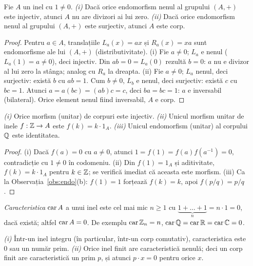 \begin{propozitie}\label{prop:endoaditiv}
Fie $A$ un inel cu $1\neq0$.
\emph{(i)} Dacă orice endomorfism nenul al grupului $(A,+)$ este injectiv, atunci $A$ nu are divizori ai lui zero.
\emph{(ii)} Dacă orice endomorfism nenul al grupului $(A,+)$ este surjectiv, atunci $A$ este corp.
\end{propozitie}
\begin{proof}
Pentru $a\in A$, translațiile $L_a(x)=ax$ și $R_a(x)=xa$ sunt endomorfisme ale lui $(A,+)$ (distributivitate).
(i) Fie $a\neq0$; $L_a$ e nenul ($L_a(1)=a\neq0$), deci injectiv. Din $ab=0=L_a(0)$ rezultă $b=0$: $a$ nu e divizor al lui zero la stânga; analog cu $R_a$ la dreapta.
(ii) Fie $a\neq0$; $L_a$ nenul, deci surjectiv: există $b$ cu $ab=1$. Cum $b\neq0$, $L_b$ e nenul, deci surjectiv: există $c$ cu $bc=1$. Atunci $a=a(bc)=(ab)c=c$, deci $ba=bc=1$: $a$ e inversabil (bilateral). Orice element nenul fiind inversabil, $A$ e corp.
\end{proof}

\begin{propozitie}\label{prop:morfcorp}
\emph{(i)} Orice morfism (unitar) de corpuri este injectiv. \emph{(ii)} Unicul morfism unitar de inele $f:\mathbb{Z}\to A$ este $f(k)=k\cdot1_A$. \emph{(iii)} Unicul endomorfism (unitar) al corpului $\mathbb{Q}$ este identitatea.
\end{propozitie}

\begin{proof}
(i) Dacă $f(a)=0$ cu $a\neq0$, atunci $1=f(1)=f(a)f(a^{-1})=0$, contradicție cu $1\neq0$ în codomeniu. (ii) Din $f(1)=1_A$ și aditivitate, $f(k)=k\cdot1_A$ pentru $k\in\mathbb{Z}$; se verifică imediat că aceasta este morfism. (iii) Ca la Observația~\ref{obs:endo}(b): $f(1)=1$ forțează $f(k)=k$, apoi $f(p/q)=p/q$.
\end{proof}

\begin{definitie}
\emph{Caracteristica} $\operatorname{car} A$ a unui inel este cel mai mic $n\ge1$ cu $\underbrace{1+\dots+1}_{n}=n\cdot1=0$, dacă există; altfel $\operatorname{car} A=0$. De exemplu $\operatorname{car}\mathbb{Z}_n=n$, $\operatorname{car}\mathbb{Q}=\operatorname{car}\mathbb{R}=\operatorname{car}\mathbb{C}=0$.
\end{definitie}

\begin{propozitie}\label{prop:caract}
\emph{(i)} Într-un inel integru (în particular, într-un corp comutativ), caracteristica este $0$ sau un număr prim. \emph{(ii)} Orice inel finit are caracteristică nenulă; deci un corp finit are caracteristică un prim $p$, și atunci $p\cdot x=0$ pentru orice $x$.
\end{propozitie}

